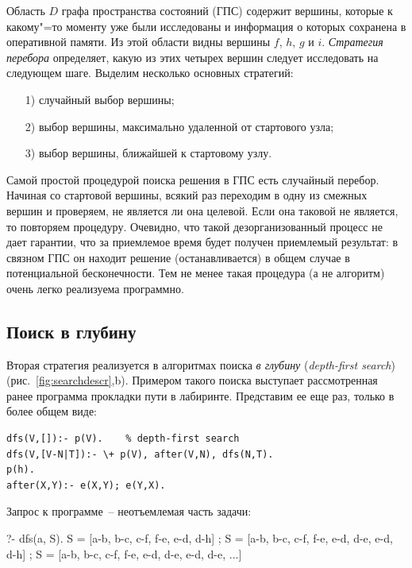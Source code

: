 \documentclass[a4paper,14pt, openany, twoside, final]{extbook} %
\newcommand{\eeng}[1]{\emph{\foreignlanguage{english}{#1}}}
\begin{document}
Область $D$ графа пространства состояний (ГПС) содержит вершины, которые к какому"=то моменту уже были исследованы и информация о которых сохранена в оперативной памяти.  Из этой области видны вершины $f$, $h$, $g$ и $i$.  \emph{Стратегия перебора} определяет, какую из этих четырех вершин следует исследовать на следующем шаге.  Выделим несколько основных стратегий:
\begin{enumerate}[parsep=0pt,itemsep=0pt]
\item[1)] случайный выбор вершины;
\item[2)] выбор вершины, максимально удаленной от стартового узла;
\item[3)] выбор вершины, ближайшей к стартовому узлу.
\end{enumerate}

Самой простой процедурой поиска решения в ГПС есть случайный перебор.  Начиная со стартовой вершины, всякий раз переходим в одну из смежных вершин и проверяем, не является ли она целевой.  Если она таковой не является, то повторяем процедуру.  Очевидно, что такой дезорганизованный процесс не дает гарантии, что за приемлемое время будет получен приемлемый результат: в связном ГПС он находит решение (останавливается) в общем случае в потенциальной бесконечности.  Тем не менее такая процедура (а не алгоритм) очень легко реализуема программно.

\subsection{Поиск в глубину}
\label{sec:depthfirst}

Вторая стратегия реализуется в алгоритмах поиска \emph{в глубину} (\eeng{depth-first search}) (рис.~\ref{fig:searchdescr},b).  Примером такого поиска выступает рассмотренная ранее программа прокладки пути в лабиринте.  Представим ее еще раз, только в более общем виде:

\begin{verbatim}
dfs(V,[]):- p(V).    % depth-first search
dfs(V,[V-N|T]):- \+ p(V), after(V,N), dfs(N,T).
p(h).
after(X,Y):- e(X,Y); e(Y,X).
\end{verbatim}

\noindent{}Запрос к программе~-- неотъемлемая часть задачи:

\begin{proexp}
?- dfs(a, S).
S = [a-b, b-c, c-f, f-e, e-d, d-h] ;
S = [a-b, b-c, c-f, f-e, e-d, d-e, e-d, d-h] ;
S = [a-b, b-c, c-f, f-e, e-d, d-e, e-d, d-e, ...]
\end{proexp}
\end{document}
